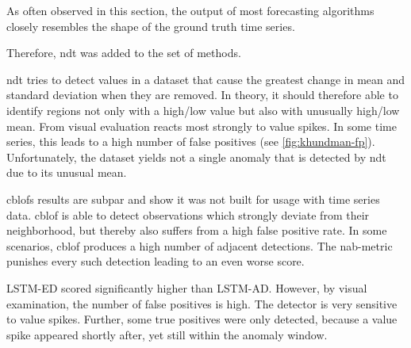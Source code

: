 \begin{description}[style=unboxed,leftmargin=0cm]
    As often observed in this section, the output of most forecasting algorithms
    closely resembles the shape of the ground truth time series.
    
    Therefore, \gls{ndt} was added to the set of methods.
    
    \gls{ndt} tries to detect values in a dataset that cause the greatest change
    in mean and standard deviation when they are removed. In theory, it should
    therefore able to identify regions not only with a high/low value but also
    with unusually high/low mean. From visual evaluation reacts most strongly to
    value spikes. In some time series, this leads to a high number of false positives
    (see \cref{fig:khundman-fp}). Unfortunately, the dataset yields not a single
    anomaly that is detected by \gls{ndt} due to its unusual mean.
    \item[LSTM-AD]
    \item[Auto-ARIMA] 
    \item[CBLOF] \gls{cblof}s results are subpar and show it was not built for
    usage with time series data. \gls{cblof} is able to detect observations which
    strongly deviate from their neighborhood, but thereby also suffers from a high
    false positive rate. In some scenarios, \gls{cblof} produces a high number of
    adjacent detections. The \gls{nab}-metric punishes every such detection leading
    to an even worse score.
    \item[LSTM-ED] LSTM-ED scored significantly higher than LSTM-AD\@. However,
    by visual examination, the number of false positives is high. The detector
    is very sensitive to value spikes. Further, some true positives were only
    detected, because a value spike appeared shortly after, yet still within
    the anomaly window.
    \item[kNN]
    \item[Prophet] 
\end{description}

